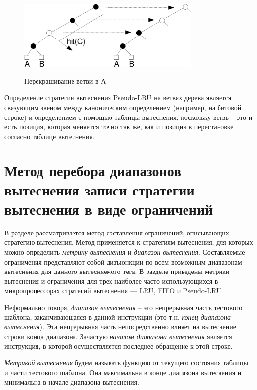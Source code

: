 \documentclass[14pt]{extreport}
\newcommand{\LRU}{\textsf{LRU}\xspace}
\newcommand{\FIFO}{\textsf{FIFO}\xspace}
\newcommand{\PseudoLRU}{\textsf{Pseudo-LRU}\xspace}
\begin{document}
\begin{figure}[h] \center
  \includegraphics[width=0.8\textwidth]{1.review/recolor}\\
  \caption{Перекрашивание ветви в А}\label{recolor}
\end{figure}


Определение стратегии вытеснения \PseudoLRU на ветвях дерева
является связующим звеном между каноническим определением (например,
на битовой строке) и определением с помощью таблицы вытеснения,
поскольку ветвь -- это и есть позиция, которая меняется точно так
же, как и позиция в перестановке согласно таблице вытеснения.

\section{Метод перебора диапазонов вытеснения записи стратегии
вытеснения в виде ограничений}

{\footnotesize В разделе рассматривается метод составления ограничений, описывающих
стратегию вытеснения. Метод применяется к стратегиям вытеснения, для
которых можно определить \emph{метрику вытеснения} и \emph{диапазон
вытеснения}. Составляемые ограничения представляют собой дизъюнкции
по всем возможным диапазонам вытеснения для данного вытесняемого
тега. В разделе приведены метрики вытеснения и ограничения для трех
наиболее часто использующихся в микропроцессорах стратегий
вытеснения --- \LRU, \FIFO и \PseudoLRU}.

Неформально говоря, \emph{диапазон вытеснения} -- это непрерывная
часть тестового шаблона, заканчивающаяся в данной инструкции (это
т.н. \emph{конец диапазона вытеснения}). Эта непрерывная часть непосредственно
влияет на вытеснение строки конца диапазона.
Зачастую \emph{началом диапазона вытеснения} является инструкция, в
которой осуществляется последнее обращение к этой строке.

\emph{Метрикой вытеснения} будем называть функцию от текущего
состояния таблицы и части тестового шаблона. Она
максимальна в конце диапазона вытеснения и минимальна в начале
диапазона вытеснения.
\end{document}
